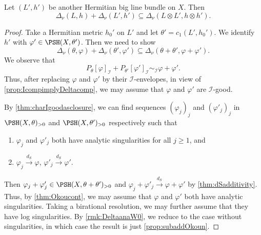 \begin{proposition}\label{prop:suba}
	Let $(L', h')$ be another Hermitian big line bundle on $X$. Then
	\[
		\Delta_{\nu}(L,h)+\Delta_{\nu}(L', h')\subseteq\Delta_{\nu}(L\otimes L',h\otimes h').
	\]
\end{proposition}
\begin{proof}
	Take a Hermitian metric $h_0'$ on $L'$ and let $\theta'=c_1(L',h_0')$. We identify $h'$ with $\varphi'\in \PSH(X,\theta')$. Then we need to show
	\begin{equation}\label{eq:suba}
		\Delta_{\nu}(\theta,\varphi)+\Delta_{\nu}(\theta',\varphi')\subseteq \Delta_{\nu}(\theta+\theta',\varphi+\varphi').
	\end{equation}
    We observe that
    \[
    P_{\theta}[\varphi]_{\mathcal{I}}+P_{\theta'}[\varphi']_{\mathcal{I}}\sim_{\mathcal{I}} \varphi+\varphi'.
    \]
    Thus, after replacing $\varphi$ and $\varphi'$ by their $\mathcal{I}$-envelopes, in view of \cref{prop:IcompimplyDeltacomp}, we may assume that $\varphi$ and $\varphi'$ are $\mathcal{I}$-good.


	By \cref{thm:charIgoodasclosure}, we can find sequences $(\varphi_j)_j$ and $(\varphi'_j)_j$ in $\PSH(X,\theta)_{>0}$ and $\PSH(X,\theta')_{>0}$ respectively such that
	\begin{enumerate}
		\item\label{itm:chapter-Okounkov:L930:1} $\varphi_j$ and $\varphi'_j$ both have analytic singularities for all $j\geq 1$, and
		\item\label{itm:chapter-Okounkov:L930:2} $\varphi_j\xrightarrow{d_S}\varphi$, $\varphi'_j\xrightarrow{d_S}\varphi'$.
	\end{enumerate}
	Then $\varphi_j+\varphi'_j\in \PSH(X,\theta+\theta')_{>0}$ and $\varphi_j+\varphi'_j\xrightarrow{d_S} \varphi+\varphi'$ by \cref{thm:dSadditivity}. Thus, by \cref{thm:Okoucont}, we may assume that $\varphi$ and $\varphi'$ both have analytic singularities. Taking a birational resolution, we may further assume that they have log singularities. By \cref{rmk:DeltaanaW0}, we reduce to the case without singularities, in which case the result is just \cref{prop:subaddOkoun}.
\end{proof}

